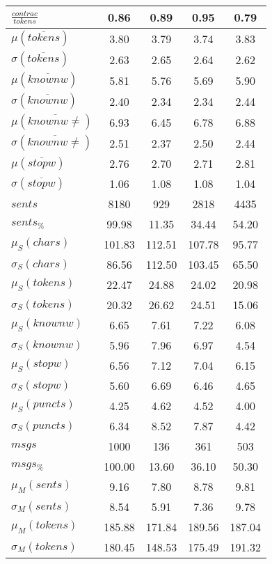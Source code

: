 \begin{table}[h!]
\begin{center}
\begin{tabular}{| l || c | c | c | c |}
$\frac{contrac}{tokens}$ & 0.86  & 0.89  & 0.95  & 0.79 \\\hline\hline
$\mu(\overline{tokens})$ & 3.80  & 3.79  & 3.74  & 3.83 \\
$\sigma(\overline{tokens})$ & 2.63  & 2.65  & 2.64  & 2.62 \\\hline
$\mu(\overline{knownw})$ & 5.81  & 5.76  & 5.69  & 5.90 \\
$\sigma(\overline{knownw})$ & 2.40  & 2.34  & 2.34  & 2.44 \\\hline
$\mu(\overline{knownw \neq})$ & 6.93  & 6.45  & 6.78  & 6.88 \\
$\sigma(\overline{knownw \neq})$ & 2.51  & 2.37  & 2.50  & 2.44 \\\hline
$\mu(\overline{stopw})$ & 2.76  & 2.70  & 2.71  & 2.81 \\
$\sigma(\overline{stopw})$ & 1.06  & 1.08  & 1.08  & 1.04 \\\hline\hline
$sents$ & 8180  & 929  & 2818  & 4435 \\
$sents_{\%}$ & 99.98  & 11.35  & 34.44  & 54.20 \\\hline
$\mu_S(chars)$ & 101.83  & 112.51  & 107.78  & 95.77 \\
$\sigma_S(chars)$ & 86.56  & 112.50  & 103.45  & 65.50 \\\hline
$\mu_S(tokens)$ & 22.47  & 24.88  & 24.02  & 20.98 \\
$\sigma_S(tokens)$ & 20.32  & 26.62  & 24.51  & 15.06 \\\hline
$\mu_S(knownw)$ & 6.65  & 7.61  & 7.22  & 6.08 \\
$\sigma_S(knownw)$ & 5.96  & 7.96  & 6.97  & 4.54 \\\hline
$\mu_S(stopw)$ & 6.56  & 7.12  & 7.04  & 6.15 \\
$\sigma_S(stopw)$ & 5.60  & 6.69  & 6.46  & 4.65 \\\hline
$\mu_S(puncts)$ & 4.25  & 4.62  & 4.52  & 4.00 \\
$\sigma_S(puncts)$ & 6.34  & 8.52  & 7.87  & 4.42 \\\hline\hline
$msgs$ & 1000  & 136  & 361  & 503 \\
$msgs_{\%}$ & 100.00  & 13.60  & 36.10  & 50.30 \\\hline
$\mu_M(sents)$ & 9.16  & 7.80  & 8.78  & 9.81 \\
$\sigma_M(sents)$ & 8.54  & 5.91  & 7.36  & 9.78 \\\hline
$\mu_M(tokens)$ & 185.88  & 171.84  & 189.56  & 187.04 \\
$\sigma_M(tokens)$ & 180.45  & 148.53  & 175.49  & 191.32 \\\hline

\end{tabular}
\end{center}
\end{table}
